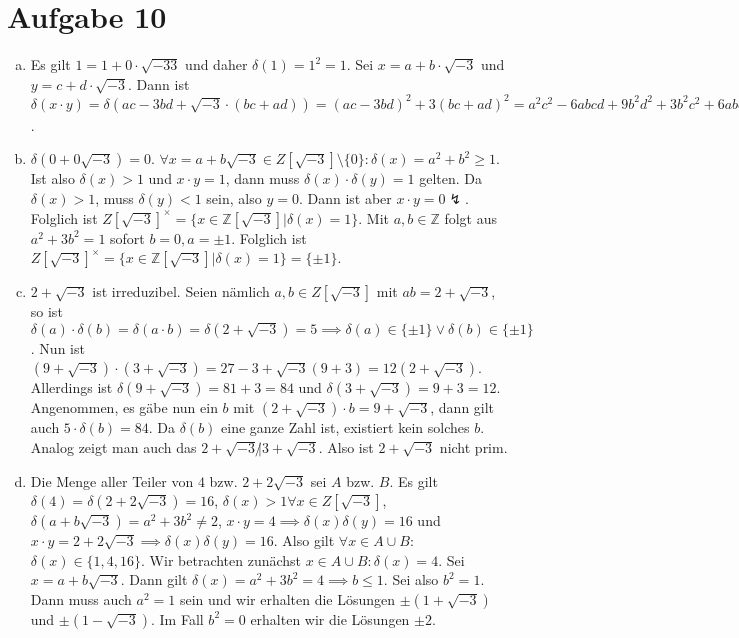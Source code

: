 \documentclass{article}
\theoremstyle{definition}
\newcommand{\Z}{\mathbb{Z}}
\begin{document}
\section*{Aufgabe 10}
\begin{enumerate}[(a)]
	\item Es gilt $1 = 1 + 0 \cdot \sqrt{-33}$ und daher $\delta(1) = 1^2 = 1$. Sei $x = a + b\cdot \sqrt{-3}$ und $y = c + d\cdot\sqrt{-3}$. Dann ist $\delta(x\cdot y) = \delta(ac - 3bd + \sqrt{-3}\cdot (bc + ad)) = (ac - 3bd)^2 + 3(bc + ad)^2 = a^2c^2 - 6abcd + 9b^2d^2 + 3b^2c^2 + 6abcd + 3a^2d^2 = (a^2 + 3b^2) \cdot (c^2 + 3d^2) = \delta(x)\cdot \delta(y)$.
	\item $\delta(0 + 0 \sqrt{-3}) = 0$. $\forall x = a + b\sqrt{-3} \in Z[\sqrt{-3}]\setminus\{0\}: \delta(x) = a^2 + b^2 \geq 1$. Ist also $\delta(x) > 1$ und $x \cdot y = 1$, dann muss $\delta(x) \cdot \delta(y) =1$ gelten. Da $\delta(x) > 1$, muss $\delta(y) < 1$ sein, also $y = 0$. Dann ist aber $x\cdot y = 0\lightning$. Folglich ist $Z[\sqrt{-3}]^\times = \{x \in \Z[\sqrt{-3}]|\delta(x) = 1\}$. Mit $a, b\in \Z$ folgt aus $a^2 + 3b^2 = 1$ sofort $b= 0, a = \pm 1$. Folglich ist $Z[\sqrt{-3}]^\times = \{x \in \Z[\sqrt{-3}]|\delta(x) = 1\} = \{\pm 1\}$.
	\item $2 + \sqrt{-3}$ ist irreduzibel. 
	Seien nämlich $a, b\in Z[\sqrt{-3}]$ mit $ab = 2 + \sqrt{-3}$, so ist $\delta(a)\cdot \delta(b) = \delta(a\cdot b) = \delta(2 + \sqrt{-3}) = 5 \implies \delta(a) \in \{\pm 1\}\lor \delta(b) \in \{\pm1\}$. 
	Nun ist $(9 + \sqrt{-3}) \cdot (3 + \sqrt{-3}) = 27 - 3 + \sqrt{-3} (9+3) = 12(2 + \sqrt{-3})$. Allerdings ist $\delta(9 + \sqrt{-3}) = 81 + 3 = 84$ und $\delta(3 + \sqrt{-3}) = 9 + 3 = 12$. 
	Angenommen, es gäbe nun ein $b$ mit $(2 + \sqrt{-3}) \cdot b = 9 + \sqrt{-3}$, dann gilt auch $5 \cdot \delta(b) = 84$. Da $\delta(b)$ eine ganze Zahl ist, existiert kein solches $b$. 
	Analog zeigt man auch das $2 + \sqrt{-3} \not | 3 + \sqrt{-3}$. Also ist $2 + \sqrt{-3}$ nicht prim.
	\item Die Menge aller Teiler von $4$ bzw. $2 + 2 \sqrt{-3}$ sei $A$ bzw. $B$. Es gilt $\delta(4) = \delta(2 + 2\sqrt{-3}) = 16$, $\delta(x) > 1 \forall x \in Z[\sqrt{-3}]$, $\delta(a + b \sqrt{-3}) = a^2 + 3b^2 \neq 2$, $x\cdot y = 4\implies \delta(x)\delta(y) = 16$ und $x \cdot y = 2 + 2\sqrt{-3} \implies \delta(x)\delta(y) = 16$. Also gilt $\forall x\in A \cup B$: $\delta(x) \in \{1, 4, 16\}$. Wir betrachten zunächst $x \in A\cup B: \delta(x) = 4$. Sei $x = a + b\sqrt{-3}$. Dann gilt $\delta(x) = a^2 + 3b^2 = 4 \implies b \leq 1$. Sei also $b^2 = 1$. Dann muss auch $a^2 = 1$ sein und wir erhalten die Lösungen $\pm (1 + \sqrt{-3})$ und $\pm (1 - \sqrt{-3})$. Im Fall $b^2 = 0$ erhalten wir die Lösungen $\pm 2$.

\end{enumerate}
\end{document}
